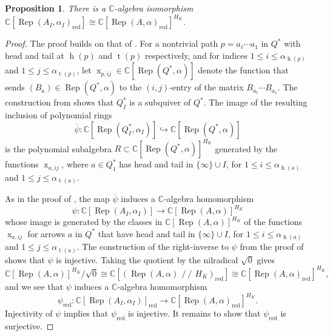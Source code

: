 \documentclass[11pt,reqno]{amsart}
\numberwithin{equation}{section}
\newtheorem{proposition}[theorem]{Proposition}
\theoremstyle{definition}
\newcommand{\CC}{\ensuremath{\mathbb{C}}}
\newcommand{\git}{\ensuremath{\operatorname{\!/\!\!/\!}}}
\newcommand{\head}{\operatorname{h}}
\newcommand{\Rep}{\operatorname{Rep}}
\newcommand{\tail}{\operatorname{t}}
\newcommand{\xpij}[2]{\operatorname{x}_{#1,#2}}
\begin{document}
 \begin{proposition}
 \label{prop:psired}
 There is a $\CC$-algebra isomorphism $\CC[\Rep(A_I,\alpha_I)_{
\mathrm{red}}]\cong \CC[\Rep(A,\alpha)_{\mathrm{red}}]^{H_K}$.
 \end{proposition}
 \begin{proof}
 The proof builds on that of \cite[Theorem~5.3]{CY23}. For a nontrivial path $p=a_\ell\cdots a_1$ in $Q^*$ with head and tail at $\head(p)$ and $\tail(p)$ respectively, and for indices $1\leq i\leq \alpha_{\head(p)}$ and $1\leq j\leq \alpha_{\tail(p)}$, let $\xpij{p}{ij}\in\CC[\Rep(Q^*,\alpha)]$ denote the function that sends $(B_a)\in \Rep(Q^*,\alpha)$ to the $(i,j)$-entry of the matrix $B_{a_\ell}\cdots B_{a_1}$. The construction from  
 \cite[Proposition~3.3]{CGGS1} shows that $Q_I^*$ is a subquiver of $Q^*$.  The image of the resulting inclusion of polynomial rings 
 \[
 \overline{\psi}\colon\CC[\Rep(Q_I^*,\alpha_I)]\hookrightarrow \CC[\Rep(Q^*,\alpha)]
 \]
 is the polynomial subalgebra $R\subset \CC[\Rep(Q^*,\alpha)]^{H_K}$ generated by the functions $\xpij{a}{ij}$, where $a\in Q^*_1$ has head and tail in $\{\infty\}\cup I$, for $1\leq i\leq \alpha_{\head(a)}$ and $1\leq j\leq \alpha_{\tail(a)}$.  
 
  As in the proof of \cite[Theorem~5.3]{CY23}, the map $\overline{\psi}$ induces a $\CC$-algebra homomorphism
 \[
\psi\colon \CC[\Rep(A_I,\alpha_I)]\longrightarrow \CC[\Rep(A,\alpha)]^{H_K}
\]
whose image is generated by the classes in $\CC[\Rep(A,\alpha)]^{H_K}$ of the functions $\xpij{a}{ij}$ for arrows $a$ in $Q^*$ that have head and tail in $\{\infty\}\cup I$, for $1\leq i\leq \alpha_{\head(a)}$ and $1\leq j\leq \alpha_{\tail(a)}$. The construction of the right-inverse to $\psi$ from the proof of \cite[Theorem~5.3]{CY23} shows that $\psi$ is injective. Taking the quotient by the nilradical $\sqrt{0}$ gives 
\[
\CC[\Rep(A,\alpha)]^{H_K}/\sqrt{0}\cong \CC[(\Rep(A,\alpha)\git H_K)_{\mathrm{red}}]\cong 
 \CC[\Rep(A,\alpha)_{\mathrm{red}}]^{H_K},\]
 and we see that $\psi$ induces a $\CC$-algebra homomorphism 
 \[
  \psi_{\mathrm{red}}\colon \CC[\Rep(A_I,\alpha_I)]_{\mathrm{red}}\longrightarrow \CC[\Rep(A,\alpha)_{\mathrm{red}}]^{H_K}.
  \]
 Injectivity of $\psi$ implies that $\psi_{\mathrm{red}}$ is injective. It remains to show that $\psi_{\mathrm{red}}$ is surjective. 


\end{proof}
\end{document}
